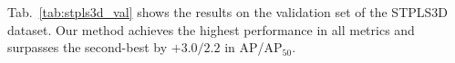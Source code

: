 \documentclass[10pt,twocolumn,letterpaper]{article}
\def\Approach{ISBNet}
\begin{document}
 Tab.~\ref{tab:stpls3d_val} shows the results on the validation set of the STPLS3D dataset. Our method achieves the highest performance in all metrics and surpasses the second-best by $+3.0/2.2$ in AP/AP$_{50}$. 

\end{document}
